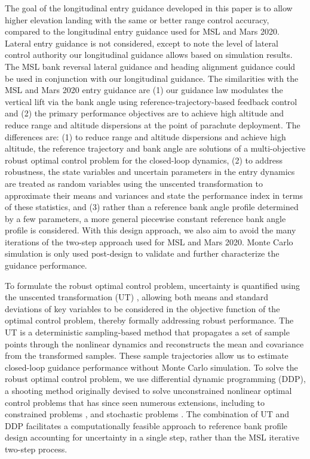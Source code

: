 \documentclass[journal ]{new-aiaa}
\begin{document}
The goal of the longitudinal entry guidance developed in this paper is to allow higher elevation landing with the same or better range control accuracy, compared to the longitudinal entry guidance used for MSL and Mars 2020. Lateral entry guidance is not considered, except to note the level of lateral control authority our longitudinal guidance allows based on simulation results. The MSL bank reversal lateral guidance and heading alignment guidance could be used in conjunction with our longitudinal guidance. The similarities with the MSL and Mars 2020 entry guidance are (1) our guidance law modulates the vertical lift via the bank angle using reference-trajectory-based feedback control and (2) the primary performance objectives are to achieve high altitude and reduce range and altitude dispersions at the point of parachute deployment. The differences are: (1) to reduce range and altitude dispersions and achieve high altitude, the reference trajectory and bank angle are solutions of a multi-objective robust optimal control problem for the closed-loop dynamics, (2) to address robustness, the state variables and uncertain parameters in the entry dynamics are treated as random variables using the unscented transformation to approximate their means and variances and state the performance index in terms of these statistics, and (3) rather than a reference bank angle profile determined by a few parameters, a more general piecewise constant reference bank angle profile is considered. With this design approach, we also aim to avoid the many iterations of the two-step approach used for MSL and Mars 2020. Monte Carlo simulation is only used post-design to validate and further characterize the guidance performance.

To formulate the robust optimal control problem, uncertainty is quantified using the unscented transformation (UT) \cite{UT1997}, allowing both means and standard deviations of key variables to be considered in the objective function of the optimal control problem, thereby formally addressing robust performance. The UT is a deterministic sampling-based method that propagates a set of sample points through the nonlinear dynamics and reconstructs the mean and covariance from the transformed samples. These sample trajectories allow us to estimate closed-loop guidance performance without Monte Carlo simulation. To solve the robust optimal control problem, we use differential dynamic programming (DDP)\cite{DDP,DDP2}, a shooting method originally devised to solve unconstrained nonlinear optimal control problems that has since seen numerous extensions, including to constrained problems \cite{DDP_ControlLimited,HDDP1,HDDP2,DDP_NonlinearConstraints,DDP_InteriorPoint}, and stochastic problems \cite{iLQG, DDP_Stochastic, ozaki_UT,ozaki2020tube}. The combination of UT and DDP facilitates a computationally feasible approach to reference bank profile design accounting for uncertainty in a single step, rather than the MSL iterative two-step process.
\end{document}

